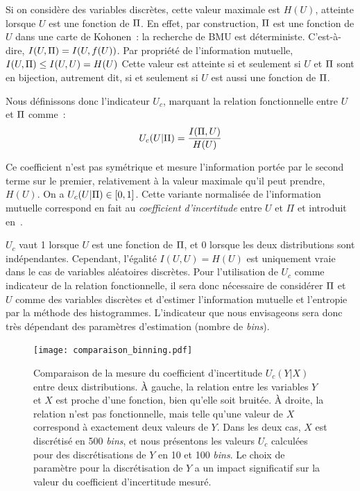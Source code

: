 \documentclass[../main]{subfiles}
\begin{document}
Si on considère des variables discrètes, cette valeur maximale est $H(U)$, atteinte lorsque $U$ est une fonction de $\Pi$.
En effet, par construction, $\Pi$ est une fonction de $U$ dans une carte de Kohonen~: la recherche de BMU est déterministe. C'est-à-dire, $I(U,\Pi) = I (U, f(U))$.
Par propriété de l'information mutuelle, $I(U,\Pi) \leq I(U,U) = H(U)$
Cette valeur est atteinte si et seulement si $U$ et $\Pi$ sont en bijection, autrement dit, si et seulement si $U$ est aussi une fonction de $\Pi$.

Nous définissons donc l'indicateur $U_c$, marquant la relation fonctionnelle entre $U$ et $\Pi$ comme~:
\begin{equation}
U_c(U|\Pi) = \frac{I(\Pi,U)}{H(U)}
\end{equation}

Ce coefficient n'est pas symétrique et mesure l'information portée par le second terme sur le premier, relativement à la valeur maximale qu'il peut prendre, $H(U)$. 
On a $U_c(U|\Pi) \in [0,1]$. 
Cette variante normalisée de l'information mutuelle correspond en fait au \emph{coefficient d'incertitude} entre $U$ et $\Pi$ et introduit en~\cite{Theil1961EconomicFA}.

$U_c$ vaut 1 lorsque $U$ est une fonction de $\Pi$, et $0$ lorsque les deux distributions sont indépendantes.
Cependant, l'égalité $I(U,U) = H(U)$ est uniquement vraie dans le cas de variables aléatoires discrètes.
Pour l'utilisation de $U_c$ comme indicateur de la relation fonctionnelle, il sera donc nécessaire de considérer $\Pi$ et $U$ comme des variables discrètes et d'estimer l'information mutuelle et l'entropie par la méthode des histogrammes. L'indicateur que nous envisageons sera donc très dépendant des paramètres d'estimation (nombre de \emph{bins}).

\begin{figure}
    \centering
    \texttt{[image: comparaison\_binning.pdf]}
    \caption{Comparaison de la mesure du coefficient d'incertitude $U_c(Y|X)$ entre deux distributions. À gauche, la relation entre les variables $Y$ et $X$ est proche d'une fonction, bien qu'elle soit bruitée. À droite, la relation n'est pas fonctionnelle, mais telle qu'une valeur de $X$ correspond à exactement deux valeurs de $Y$. Dans les deux cas, $X$ est discrétisé en 500 \emph{bins}, et nous présentons les valeurs $U_c$ calculées pour des discrétisations de $Y$ en 10 et 100 \emph{bins}. Le choix de paramètre pour la discrétisation de $Y$ a un impact significatif sur la valeur du coefficient d'incertitude mesuré.}
    \label{fig:exemple-limite}
    \end{figure}
\end{document}
